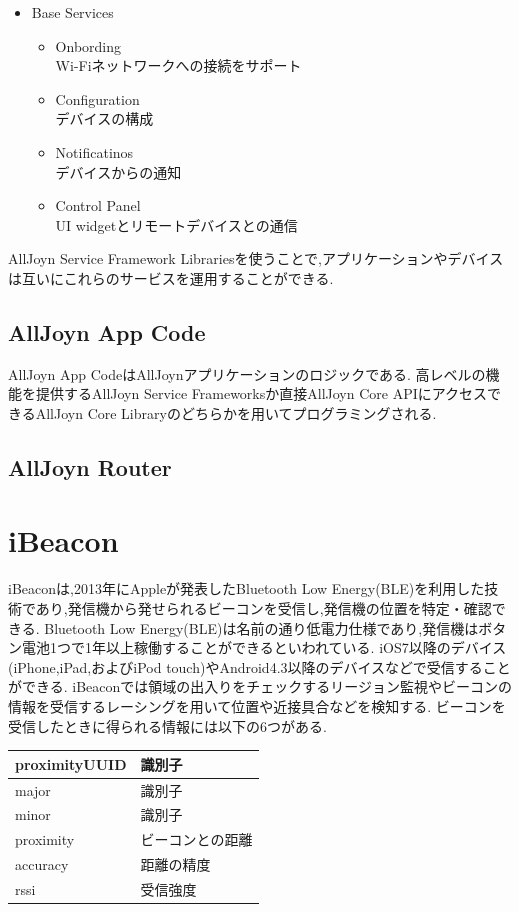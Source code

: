 \begin{itemize}
\item Base Services
\begin{itemize}
\item Onbording \\
Wi-Fiネットワークへの接続をサポート
\item Configuration \\
デバイスの構成
\item Notificatinos \\
デバイスからの通知
\item Control Panel \\
UI widgetとリモートデバイスとの通信
\end{itemize}
\end{itemize}

AllJoyn Service Framework Librariesを使うことで,アプリケーションやデバイスは互いにこれらのサービスを運用することができる.


\subsection{AllJoyn App Code}
AllJoyn App CodeはAllJoynアプリケーションのロジックである.
高レベルの機能を提供するAllJoyn Service Frameworksか直接AllJoyn Core APIにアクセスできるAllJoyn Core Libraryのどちらかを用いてプログラミングされる.

\subsection{AllJoyn Router}


\section{iBeacon}
iBeacon\cite{iBeacon}は,2013年にAppleが発表したBluetooth Low Energy(BLE)を利用した技術であり,発信機から発せられるビーコンを受信し,発信機の位置を特定・確認できる.
Bluetooth Low Energy(BLE)は名前の通り低電力仕様であり,発信機はボタン電池1つで1年以上稼働することができるといわれている.
iOS7以降のデバイス(iPhone,iPad,およびiPod touch)やAndroid4.3以降のデバイスなどで受信することができる.
iBeaconでは領域の出入りをチェックするリージョン監視やビーコンの情報を受信するレーシングを用いて位置や近接具合などを検知する.
ビーコンを受信したときに得られる情報には以下の6つがある.


\begin{center}
\begin{table}[htb]
\begin{tabular}{|l|l|}  \hline
proximityUUID & 識別子 \\ \hline
major & 識別子 \\  \hline
minor & 識別子 \\ \hline
proximity & ビーコンとの距離 \\ \hline
accuracy & 距離の精度 \\ \hline
rssi & 受信強度 \\ \hline
\end{tabular}
\end{table}
\end{center}

